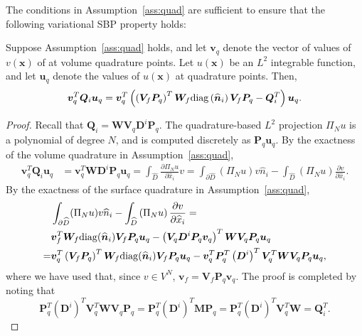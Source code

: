 \documentclass[review]{siamart0216}
\theoremstyle{assumption}
\renewcommand{\hat}[1]{\hat{#1}}
\newcommand{\pd}[2]{\frac{\partial#1}{\partial#2}}
\newcommand{\LRp}[1]{\left( #1 \right)}
\renewcommand{\hat}{\widehat}
\newcommand{\diag}[1]{{\rm diag}\LRp{#1}}
\begin{document}
The conditions in Assumption~\ref{ass:quad} are sufficient to ensure that the following variational SBP property holds:
\begin{lemma}
\label{lemma:vsbp}
Suppose Assumption~\ref{ass:quad} holds, and let $\bm{v}_q$ denote the vector of values of $v(\bm{x})$ of at volume quadrature points. Let $u(\bm{x})$ be an $L^2$ integrable function, and let $\bm{u}_q$ denote the values of $u(\bm{x})$ at quadrature points.  Then, 
\[
\bm{v}_q^T\bm{Q}_i \bm{u}_q = \bm{v}_q^T\LRp{ \LRp{\bm{V}_f\bm{P}_q}^T \bm{W}_f \diag{\hat{\bm{n}}_i}\bm{V}_f\bm{P}_q - \bm{Q}_i^T}\bm{u}_q.
\]
\end{lemma}
\begin{proof}
Recall that $\bm{Q}_i = \bm{W} \bm{V}_q \bm{D}^i\bm{P}_q$.  The quadrature-based $L^2$ projection $\Pi_Nu$ is a polynomial of degree $N$, and is computed discretely as $\bm{P}_q\bm{u}_q$.  By the exactness of the volume quadrature in Assumption~\ref{ass:quad}, 
\begin{align*}
\bm{v}_q^T\bm{Q}_i \bm{u}_q &= \bm{v}_q^T\bm{W} \bm{D}^i \bm{P}_q \bm{u}_q = \int_{\hat{D}} \pd{\Pi_N u}{\hat{x}_i} v = \int_{\partial \hat{D}} (\Pi_N u) v \hat{n}_i - \int_{\hat{D}} \LRp{\Pi_N u} \pd{v}{\hat{x}_i}.
\end{align*}
By the exactness of the surface quadrature in Assumption~\ref{ass:quad}, 
\begin{align*}
&\int_{\partial \hat{D}} (\Pi_N u) v \hat{n}_i -   \int_{\hat{D}} \LRp{\Pi_N u} \pd{v}{\hat{x}_i} =\\
 &\bm{v}_f^T\bm{W}_f{\rm diag}(\hat{\bm{n}}_i) \bm{V}_f\bm{P}_q\bm{u}_q - \LRp{\bm{V}_q\bm{D}^i\bm{P}_q\bm{v}_q}^T\bm{W} \bm{V}_q\bm{P}_q\bm{u}_q\\
=& \bm{v}_q^T \LRp{\bm{V}_f\bm{P}_q}^T\bm{W}_f{\rm diag}(\hat{\bm{n}}_i) \bm{V}_f\bm{P}_q\bm{u}_q - \bm{v}_q^T \bm{P}_q^T\LRp{\bm{D}^i}^T \bm{V}_q^T \bm{W} \bm{V}_q\bm{P}_q\bm{u}_q,
\end{align*}
where we have used that, since $v \in V^N$, $\bm{v}_f = \bm{V}_f\bm{P}_q\bm{v}_q$.  The proof is completed by noting that 
\[
\bm{P}_q^T\LRp{\bm{D}^i}^T \bm{V}_q^T \bm{W} \bm{V}_q\bm{P}_q = \bm{P}_q^T\LRp{\bm{D}^i}^T \bm{M}\bm{P}_q = \bm{P}_q^T\LRp{\bm{D}^i}^T \bm{V}_q^T\bm{W} = \bm{Q}_i^T.
\]
\end{proof}
\end{document}
